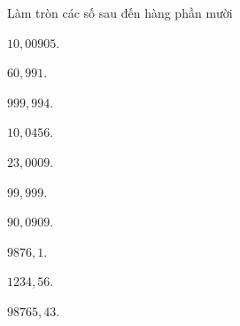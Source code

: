 \begin{bt}%
	Làm tròn các số sau đến hàng phần mười
	\begin{listEX}[5]
		\item $ 10{,}00905 $.
		\item $ 60{,}991 $.
		\item $ 999{,}994 $.
		\item $ 10{,}0456 $.
		\item $ 23{,}0009 $.
		\item $ 99{,}999 $.
		\item $ 90{,}0909 $.
		\item $ 9876{,}1 $.
		\item $ 1234{,}56 $.
		\item $ 98765{,}43 $.
	\end{listEX}	
\end{bt}
